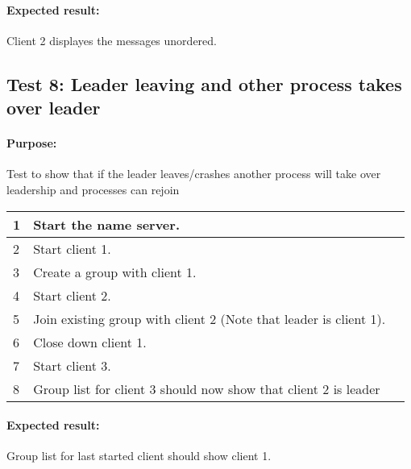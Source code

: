 \paragraph{Expected result: } Client 2 displayes the messages unordered.

\subsection*{Test 8: Leader leaving and other process takes over leader}
\paragraph{Purpose: } Test to show that if the leader leaves/crashes another process will take over leadership and processes can rejoin

\begin{table}[h!]
	\begin{tabularx}{\textwidth}{|l|X|p{8pt}|}
		\hline
		1 & Start the name server. & \\
		\hline
		2 & Start client 1.  & \\
		\hline
		3 & Create a group with client 1. & \\
		\hline
		4 & Start client 2. & \\
		\hline
		5 & Join existing group with client 2 (Note that leader is client 1).& \\
		\hline
		6 & Close down client 1. & \\
		\hline
		7 & Start client 3. & \\
		\hline
		8 & Group list for client 3 should now show that client 2 is leader & \\
		\hline
	\end{tabularx}
\end{table}

\paragraph{Expected result: } Group list for last started client should show client 1.
